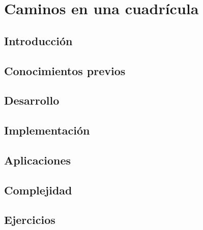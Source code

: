 \chapter{Caminos en una cuadrícula}
\section{Introducción}

\section{Conocimientos previos}

\section{Desarrollo}

\section{Implementación}

\section{Aplicaciones}

\section{Complejidad}

\section{Ejercicios}
